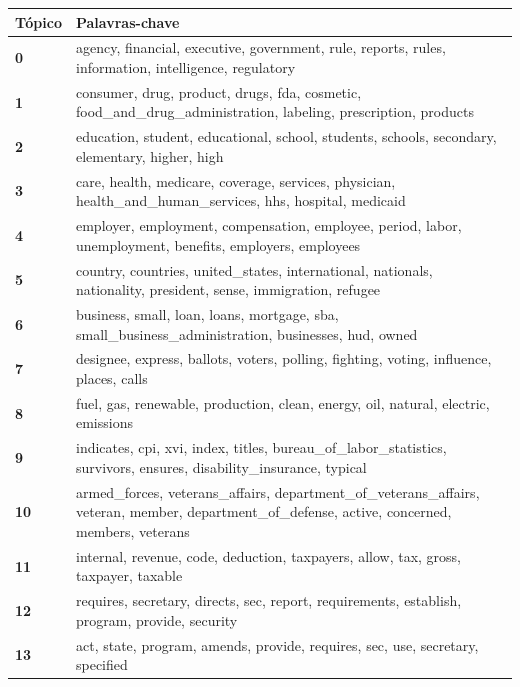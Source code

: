 \begin{table}[htpb]
    \centering
    \scriptsize
    \begin{tabularx}{\textwidth}{@{}l X@{}}
        \toprule
        \textbf{Tópico} & \textbf{Palavras-chave} \\
        \midrule
        \textbf{0} & agency, financial, executive, government, rule, reports, rules, information, intelligence, regulatory \\
        \textbf{1} & consumer, drug, product, drugs, fda, cosmetic, food\_and\_drug\_administration, labeling, prescription, products \\
        \textbf{2} & education, student, educational, school, students, schools, secondary, elementary, higher, high \\
        \textbf{3} & care, health, medicare, coverage, services, physician, health\_and\_human\_services, hhs, hospital, medicaid \\
        \textbf{4} & employer, employment, compensation, employee, period, labor, unemployment, benefits, employers, employees \\
        \textbf{5} & country, countries, united\_states, international, nationals, nationality, president, sense, immigration, refugee \\
        \textbf{6} & business, small, loan, loans, mortgage, sba, small\_business\_administration, businesses, hud, owned \\
        \textbf{7} & designee, express, ballots, voters, polling, fighting, voting, influence, places, calls \\
        \textbf{8} & fuel, gas, renewable, production, clean, energy, oil, natural, electric, emissions \\
        \textbf{9} & indicates, cpi, xvi, index, titles, bureau\_of\_labor\_statistics, survivors, ensures, disability\_insurance, typical \\
        \textbf{10} & armed\_forces, veterans\_affairs, department\_of\_veterans\_affairs, veteran, member, department\_of\_defense, active, concerned, members, veterans \\
        \textbf{11} & internal, revenue, code, deduction, taxpayers, allow, tax, gross, taxpayer, taxable \\
        \textbf{12} & requires, secretary, directs, sec, report, requirements, establish, program, provide, security \\
        \textbf{13} & act, state, program, amends, provide, requires, sec, use, secretary, specified \\

\end{tabularx}
\end{table}
